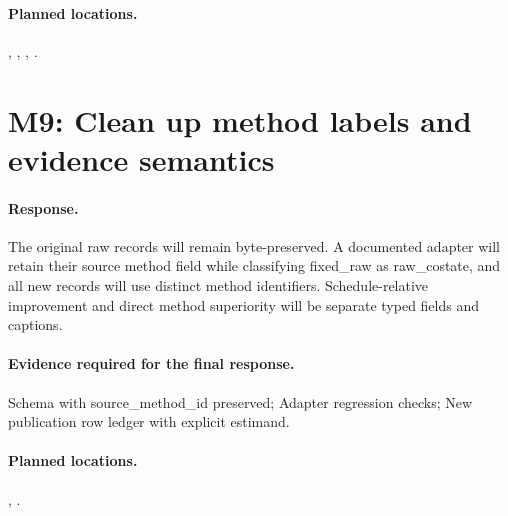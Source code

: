 \paragraph*{Planned locations.} , , , .

\section*{M9: Clean up method labels and evidence semantics}
\paragraph*{Response.} The original raw records will remain byte-preserved. A documented adapter will retain their source method field while classifying fixed\_raw as raw\_costate, and all new records will use distinct method identifiers. Schedule-relative improvement and direct method superiority will be separate typed fields and captions.
\paragraph*{Evidence required for the final response.} Schema with source\_method\_id preserved; Adapter regression checks; New publication row ledger with explicit estimand.
\paragraph*{Planned locations.} , .
